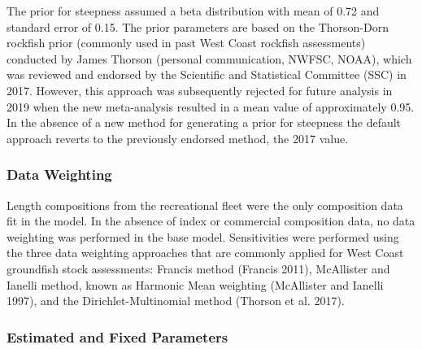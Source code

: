 \documentclass[11pt,
  english,
  a4paper,
]{article}
\begin{document}
The prior for steepness assumed a beta distribution with mean of 0.72 and standard error of 0.15. The prior parameters are based on the Thorson-Dorn rockfish prior (commonly used in past West Coast rockfish assessments) conducted by James Thorson (personal communication, NWFSC, NOAA), which was reviewed and endorsed by the Scientific and Statistical Committee (SSC) in 2017. However, this approach was subsequently rejected for future analysis in 2019 when the new meta-analysis resulted in a mean value of approximately 0.95. In the absence of a new method for generating a prior for steepness the default approach reverts to the previously endorsed method, the 2017 value.

\leavevmode\tagmcend\tagstructend\par


\hypertarget{data-weighting}{%
\subsubsection{Data Weighting}\label{data-weighting}}

\leavevmode\tagmcend\tagstructend


Length compositions from the recreational fleet were the only composition data fit in the model. In the absence of index or commercial composition data, no data weighting was performed in the base model. Sensitivities were performed using the three data weighting approaches that are commonly applied for West Coast groundfish stock assessments: Francis method {(Francis 2011)\leavevmode\tagmcend\tagstructend}, McAllister and Ianelli method, known as Harmonic Mean weighting {(McAllister and Ianelli 1997)\leavevmode\tagmcend\tagstructend}, and the Dirichlet-Multinomial method {(Thorson et al. 2017)\leavevmode\tagmcend\tagstructend}.

\leavevmode\tagmcend\tagstructend\par


\hypertarget{estimated-and-fixed-parameters}{%
\subsubsection{Estimated and Fixed Parameters}\label{estimated-and-fixed-parameters}}
\end{document}
